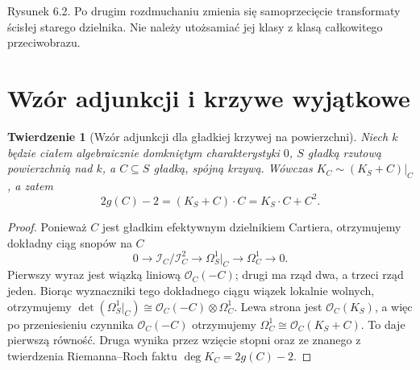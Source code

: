 \documentclass[11pt,a4paper,openany]{report}
\numberwithin{equation}{section}
\theoremstyle{plain}
\newtheorem{twierdzenie}{Twierdzenie}[section]
\theoremstyle{definition}
\theoremstyle{remark}
\begin{document}
\begin{center}
\begin{minipage}{\linewidth}
\centering
{}

{\small Rysunek 6.2. Po drugim rozdmuchaniu zmienia się samoprzecięcie transformaty ścisłej starego dzielnika. Nie należy utożsamiać jej klasy z klasą całkowitego przeciwobrazu.}\par
\end{minipage}
\end{center}

\section{Wzór adjunkcji i krzywe wyjątkowe}
\label{sec:ga6-adjunction}

\begin{twierdzenie}[Wzór adjunkcji dla gładkiej krzywej na powierzchni]
\label{tw:ga6-adjunction}
Niech $k$ będzie ciałem algebraicznie domkniętym
charakterystyki $0$, $S$ gładką rzutową powierzchnią
nad $k$, a $C\subseteq S$ gładką, spójną krzywą.
Wówczas
$K_C\sim (K_S+C)|_C$, a zatem
\[
 2g(C)-2=(K_S+C)\cdot C=K_S\cdot C+C^2.
\]
\end{twierdzenie}
\begin{proof}
Ponieważ $C$ jest gładkim efektywnym dzielnikiem
Cartiera, otrzymujemy dokładny ciąg snopów na $C$
\[
0\longrightarrow\mathcal I_C/\mathcal I_C^2
 \longrightarrow\Omega^1_S|_C\longrightarrow\Omega^1_C
 \longrightarrow0.
\]
Pierwszy wyraz jest wiązką liniową
$\mathcal O_C(-C)$; drugi ma rząd dwa, a trzeci
rząd jeden. Biorąc wyznaczniki tego dokładnego
ciągu wiązek lokalnie wolnych, otrzymujemy
$\det(\Omega^1_S|_C)\cong
 \mathcal O_C(-C)\otimes\Omega^1_C$.
Lewa strona jest $\mathcal O_C(K_S)$,
a więc po przeniesieniu czynnika
$\mathcal O_C(-C)$ otrzymujemy
$\Omega_C^1\cong\mathcal O_C(K_S+C)$.
To daje pierwszą równość. Druga wynika przez
wzięcie stopni oraz ze znanego z twierdzenia
Riemanna--Roch faktu $\deg K_C=2g(C)-2$.
\end{proof}
\end{document}
